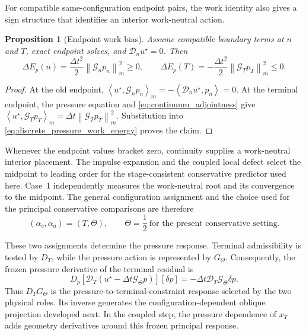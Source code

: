 \documentclass[11pt]{article}
\theoremstyle{plain}
\newtheorem{proposition}[theorem]{Proposition}
\theoremstyle{definition}
\theoremstyle{remark}
\newcommand{\D}{\mathcal{D}}
\newcommand{\G}{\mathcal{G}}
\newcommand{\dt}{\Delta t}
\newcommand{\Th}{\Theta}
\newcommand{\norm}[2][]{\left\lVert #2\right\rVert_{#1}}
\newcommand{\ip}[3][]{\left\langle #2,#3\right\rangle_{#1}}
\begin{document}
For compatible same-configuration endpoint pairs, the work identity also gives
a sign structure that identifies an interior work-neutral action.

\begin{proposition}[Endpoint work bias]
\label{prop:endpoint_work_bias}
Assume compatible boundary terms at $n$ and $T$, exact endpoint solves, and
$\D_nu^\star=0$.  Then
\begin{equation}
  \Delta E_p(n)=\frac{\dt^2}{2}\norm[m]{\G_np_n}^2\ge0,
  \qquad
  \Delta E_p(T)=-\frac{\dt^2}{2}\norm[m]{\G_Tp_T}^2\le0.
  \label{eq:endpoint_work_signs}
\end{equation}
\end{proposition}

\begin{proof}
At the old endpoint,
$\ip[m]{u^\star}{\G_np_n}=-\ip{\D_nu^\star}{p_n}=0$.
At the terminal endpoint, the pressure equation and
\eqref{eq:continuum_adjointness} give
$\ip[m]{u^\star}{\G_Tp_T}=\dt\norm[m]{\G_Tp_T}^2$.
Substitution into \eqref{eq:discrete_pressure_work_energy} proves the
claim.
\end{proof}

Whenever the endpoint values bracket zero, continuity supplies a work-neutral
interior placement.  The impulse expansion and the coupled local defect select
the midpoint to leading order for the stage-consistent conservative predictor
used here.  Case~1 independently measures the work-neutral root and its
convergence to the midpoint.  The general configuration assignment and the
choice used for the principal conservative comparisons are therefore
\begin{equation}
  \boxed{(\alpha_c,\alpha_a)=(T,\Th),
  \qquad \Th=\frac12\ \text{for the present conservative setting}.}
  \label{eq:configuration_assignment_summary}
\end{equation}

These two assignments determine the pressure response.  Terminal admissibility
is tested by $D_T$, while the pressure action is represented by $G_\Th$.
Consequently, the frozen pressure derivative of the terminal residual is
\begin{equation}
 D_p\!\left[\D_T
 (u^\star-\dt\G_\Th p)\right][\delta p]
 =-\dt\D_T\G_\Th\delta p.
 \label{eq:cross_response_as_tangent_pressure_block}
\end{equation}
Thus $D_TG_\Th$ is the pressure-to-terminal-constraint response selected by the
two physical roles.  Its inverse generates the configuration-dependent oblique
projection developed next.  In the coupled step, the pressure dependence of
$x_T$ adds geometry derivatives around this frozen principal response.
\end{document}
